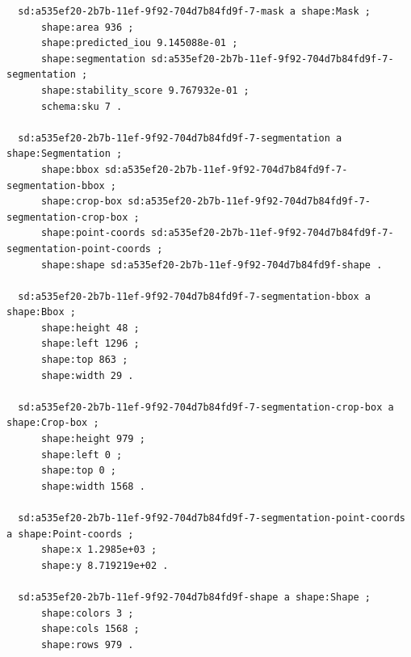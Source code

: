 \documentclass[732,fontsize=14pt,final]{studrep}
\begin{document}
\begin{verbatim}
  sd:a535ef20-2b7b-11ef-9f92-704d7b84fd9f-7-mask a shape:Mask ;
      shape:area 936 ;
      shape:predicted_iou 9.145088e-01 ;
      shape:segmentation sd:a535ef20-2b7b-11ef-9f92-704d7b84fd9f-7-segmentation ;
      shape:stability_score 9.767932e-01 ;
      schema:sku 7 .
  
  sd:a535ef20-2b7b-11ef-9f92-704d7b84fd9f-7-segmentation a shape:Segmentation ;
      shape:bbox sd:a535ef20-2b7b-11ef-9f92-704d7b84fd9f-7-segmentation-bbox ;
      shape:crop-box sd:a535ef20-2b7b-11ef-9f92-704d7b84fd9f-7-segmentation-crop-box ;
      shape:point-coords sd:a535ef20-2b7b-11ef-9f92-704d7b84fd9f-7-segmentation-point-coords ;
      shape:shape sd:a535ef20-2b7b-11ef-9f92-704d7b84fd9f-shape .
  
  sd:a535ef20-2b7b-11ef-9f92-704d7b84fd9f-7-segmentation-bbox a shape:Bbox ;
      shape:height 48 ;
      shape:left 1296 ;
      shape:top 863 ;
      shape:width 29 .
  
  sd:a535ef20-2b7b-11ef-9f92-704d7b84fd9f-7-segmentation-crop-box a shape:Crop-box ;
      shape:height 979 ;
      shape:left 0 ;
      shape:top 0 ;
      shape:width 1568 .
  
  sd:a535ef20-2b7b-11ef-9f92-704d7b84fd9f-7-segmentation-point-coords a shape:Point-coords ;
      shape:x 1.2985e+03 ;
      shape:y 8.719219e+02 .
  
  sd:a535ef20-2b7b-11ef-9f92-704d7b84fd9f-shape a shape:Shape ;
      shape:colors 3 ;
      shape:cols 1568 ;
      shape:rows 979 . 
\end{verbatim}
\end{document}

